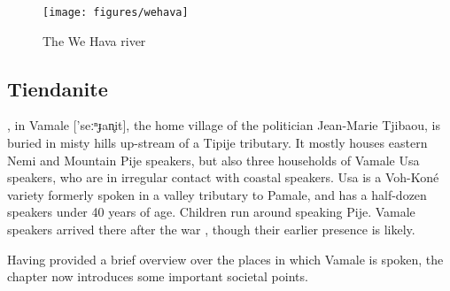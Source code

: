\begin{figure}
	\texttt{[image: figures/wehava]}
	\caption{The We Hava river}
\end{figure}

\subsection{Tiendanite}
, in Vamale ['seːⁿɟan̥it], the home village of the politician Jean-Marie Tjibaou, is buried in misty hills up-stream of a Tipije tributary. It mostly houses eastern Nemi and Mountain Pije speakers, but also three households of Vamale Usa speakers, who are in irregular contact with coastal speakers. Usa is a Voh-Koné variety formerly spoken in a valley tributary to Pamale, and has a half-dozen speakers under 40 years of age. %
Children run around speaking Pije. Vamale speakers arrived there after the war \parencite[62]{couhia_pascal_2008}, though their earlier presence is likely. %

Having provided a brief overview over the places in which Vamale is spoken, the chapter now introduces some important societal points.

